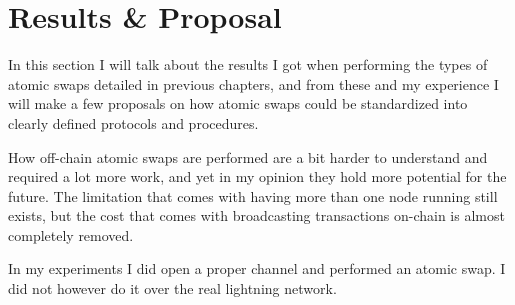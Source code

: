 \chapter{Results \& Proposal}
In this section I will talk about the results I got when performing the types of atomic swaps detailed in previous chapters, and from these and my experience I will make a few proposals on how atomic swaps could  be standardized into clearly defined protocols and procedures. 




How off-chain atomic swaps are performed are a bit harder to understand and required a lot more work, and yet in my opinion they hold more potential for the future. The limitation that comes with having more than one node running still exists, but the cost that comes with broadcasting transactions on-chain is almost completely removed. 

In my experiments I did open a proper channel and performed an atomic swap. I did not however do it over the real lightning  network. 